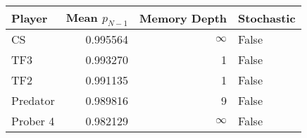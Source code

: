\begin{tabular}{lrrl}
\toprule
   Player &  Mean $p_{N-1}$ &  Memory Depth & Stochastic \\
\midrule
       CS &        0.995564 &            \(\infty\) &      False \\
      TF3 &        0.993270 &             1 &      False \\
      TF2 &        0.991135 &             1 &      False \\
 Predator &        0.989816 &             9 &      False \\
 Prober 4 &        0.982129 &            \(\infty\) &      False \\
\bottomrule
\end{tabular}
